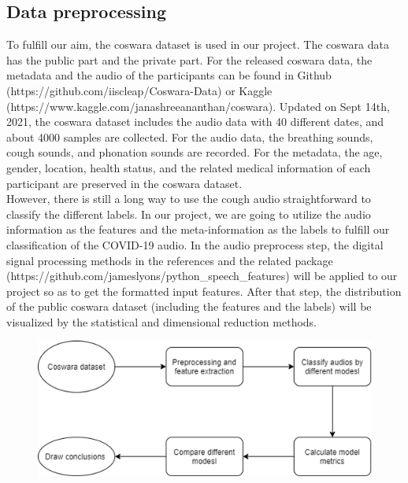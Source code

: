 \documentclass[11pt]{article}
\begin{document}
\subsection{Data preprocessing}
To fulfill our aim, the coswara dataset \cite{sharma2020coswara} is used in our project. The coswara data has the public part and the private part. For the released coswara data, the metadata and the audio of the participants can be found in Github (https://github.com/iiscleap/Coswara-Data) or Kaggle
(https://www.kaggle.com/janashreeananthan/coswara). Updated on Sept 14th, 2021, the coswara
dataset includes the audio data with 40 different dates, and about 4000 samples are collected.
For the audio data, the breathing sounds, cough sounds, and phonation sounds are recorded.
For the metadata, the age, gender, location, health status, and the related medical information of each participant are preserved in the coswara dataset.\\

\noindent
However, there is still a long way to use the cough audio straightforward to classify the different labels. In our project, we are going to utilize the audio information as the
features and the meta-information as the labels to fulfill our classification of the COVID-19
audio. In the audio preprocess step, the digital signal processing methods in the references \cite{mohammed2021ensemble} and the related package (https://github.com/jameslyons/python\_speech\_features) will be applied to our project so as to get the formatted input features. After that step, the distribution of the public coswara dataset (including the features and the labels) will be visualized by the statistical and dimensional reduction methods.  \\
\begin{figure}[htbp]
    \centering
    \includegraphics[width=.8\textwidth]{jiabao.png} %
    \label{fig_methyltech}
 \end{figure}
\end{document}

